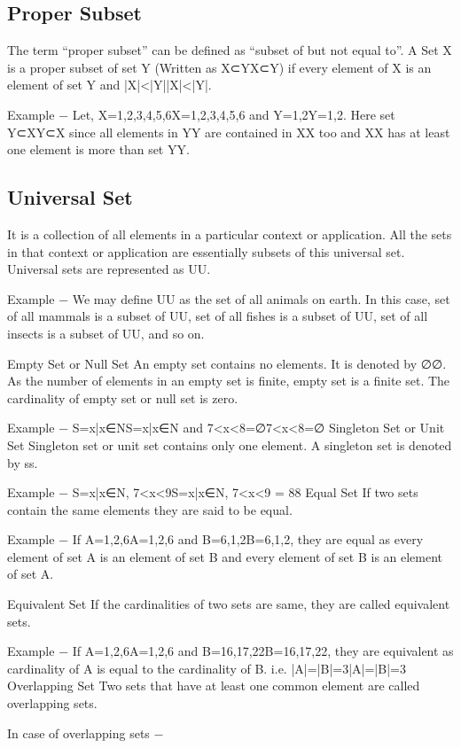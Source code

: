 \documentclass[12pt]{article}
\begin{document}
{\subsection{Proper Subset}
The term “proper subset” can be defined as “subset of but not equal to”. A Set X is a proper subset of set Y (Written as X⊂YX⊂Y) if every element of X is an element of set Y and |X|<|Y||X|<|Y|.

Example − Let, X={1,2,3,4,5,6}X={1,2,3,4,5,6} and Y={1,2}Y={1,2}. Here set Y⊂XY⊂X since all elements in YY are contained in XX too and XX has at least one element is more than set YY.

\subsection{Universal Set}
It is a collection of all elements in a particular context or application. All the sets in that context or application are essentially subsets of this universal set. Universal sets are represented as UU.

Example − We may define UU as the set of all animals on earth. In this case, set of all mammals is a subset of UU, set of all fishes is a subset of UU, set of all insects is a subset of UU, and so on.

Empty Set or Null Set
An empty set contains no elements. It is denoted by ∅∅. As the number of elements in an empty set is finite, empty set is a finite set. The cardinality of empty set or null set is zero.

Example − S={x|x∈NS={x|x∈N and 7<x<8}=∅7<x<8}=∅
Singleton Set or Unit Set
Singleton set or unit set contains only one element. A singleton set is denoted by {s}{s}.

Example − S={x|x∈N, 7<x<9}S={x|x∈N, 7<x<9} = {8}{8}
Equal Set
If two sets contain the same elements they are said to be equal.

Example − If A={1,2,6}A={1,2,6} and B={6,1,2}B={6,1,2}, they are equal as every element of set A is an element of set B and every element of set B is an element of set A.

Equivalent Set
If the cardinalities of two sets are same, they are called equivalent sets.

Example − If A={1,2,6}A={1,2,6} and B={16,17,22}B={16,17,22}, they are equivalent as cardinality of A is equal to the cardinality of B. i.e. |A|=|B|=3|A|=|B|=3
Overlapping Set
Two sets that have at least one common element are called overlapping sets.

In case of overlapping sets −

}
\end{document}
